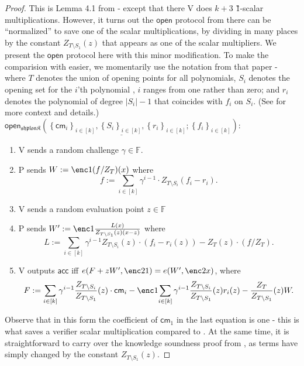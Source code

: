 \documentclass[11pt]{article} %
\newcommand{\F}{\ensuremath{\mathbb F}\xspace}
\newcommand{\cm}{\ensuremath{\mathsf{cm}}\xspace}
\newcommand{\open}{\ensuremath{\mathsf{open}}\xspace}
\newcommand{\acc}{\ensuremath{\mathsf{acc}}\xspace}
\newcommand{\defeq}{:=}
\newcommand{\sett}[2]{\ensuremath{\set{#1}_{#2}}\xspace}
\newcommand{\prvpc}{\ensuremath{\mathrm{P}}\xspace}%
\newcommand{\verpc}{\ensuremath{\mathrm{V}}\xspace}%
\newcommand{\shplonk}{\ensuremath{\mathfrak{sh}\mathfrak{p}\mathfrak{lon}\mathfrak{K}}\xspace}
\newcommand{\set}[1]{\ensuremath{\left\{#1\right\}}\xspace}
\newcommand{\openshplonk}{\ensuremath{\mathsf{open_{\shplonk}}}\xspace}
\begin{document}
\begin{proof}
 This is Lemma 4.1 from \cite{shplonk} - except that there \verpc does $k+3$ \G1-scalar multiplications.
 However, it turns out the \open protocol from there can be ``normalized'' to save one of the scalar multiplications, by dividing in many places by the constant $Z_{T\setminus S_1}(z)$ that appears as one of the scalar multipliers.
 We present the \cite{shplonk} \open protocol here with this minor modification.
 To make the comparision with \cite{shplonk} easier, we momentarily use the notation from that paper - where $T$ denotes the union of opening points for all polynomials, $S_i$ denotes the opening set for the $i$'th polynomial  , $i$ ranges from one rather than zero; and $r_i$ denotes the polynomial of degree $|S_i|-1$ that coincides with $f_i$ on $S_i$. (See \cite{shplonk} for more context and details.)\\                          
 
$\underline{\openshplonk(\sett{\cm_i}{i\in [k]},\sett{S_i}{i\in [k]},\sett{r_i}{i\in [k]}; \sett{f_i}{i\in [k]})}$:
     \begin{enumerate}
    \item \verpc sends a random challenge $\gamma\in \F$.
    \item\label{stp:W} \prvpc sends $W\defeq \enc1{(f/Z_T)(x)}$ where
    \[f\defeq \sum_{i\in [k]} \gamma^{i-1}\cdot  Z_{T\setminus S_i}(f_i-r_i).\]
    \item \verpc sends a random evaluation point $z\in \F$
    \item\label{step:W'} \prvpc sends $W'\defeq \enc1{\frac{L(x)}{Z_{T\setminus S_1}(z)(x-z)}}$ where
    \[L\defeq \sum_{i\in [k]} \gamma^{i-1}Z_{T\setminus S_i}(z)\cdot (f_i-r_i(z)) - Z_T(z)\cdot (f/Z_T).\]
    \item \verpc outputs \acc iff $e(F+zW',\enc2{1}) = e(W',\enc2{x})$,
where     \[F\defeq \sum_{i\in [k]} \gamma^{i-1}  \frac{Z_{T\setminus S_i}}{Z_{T\setminus S_1}}(z)\cdot \cm_i - \enc1{\sum_{i\in [k]} \gamma^{i-1} \frac{Z_{T\setminus S_i}}{Z_{T\setminus S_1}}(z)r_i(z)} - \frac{Z_T}{Z_{T\setminus S_1}}(z)W.\]
    \end{enumerate}
Observe that in this form the coefficient of $\cm_1$ in the last equation is one - this is what saves a verifier scalar multiplication compared to \cite{shplonk}. At the same time, it is straightforward to carry over the knowledge soundness proof from \cite{shplonk}, as terms have simply changed by the constant $Z_{T\setminus S_1}(z)$.
\end{proof}
\end{document}
